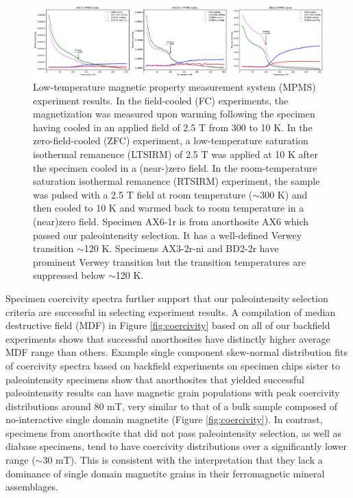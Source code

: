 \documentclass[draft]{agujournal2019}
\begin{document}
\begin{figure}[h!]
\noindent\includegraphics[width=\textwidth]{MPMS.pdf}
\centering
\caption{\footnotesize{Low-temperature magnetic property measurement system (MPMS) experiment results. In the field-cooled (FC) experiments, the magnetization was measured upon warming following the specimen having cooled in an applied field of 2.5 T from 300 to 10 K. In the zero-field-cooled (ZFC) experiment, a low-temperature saturation isothermal remanence (LTSIRM) of 2.5 T was applied at 10 K after the specimen cooled in a (near-)zero field. In the room-temperature saturation isothermal remanence (RTSIRM) experiment, the sample was pulsed with a 2.5 T field at room temperature ($\sim$300 K) and then cooled to 10 K and warmed back to room temperature in a (near)zero field. Specimen AX6-1r is from anorthosite AX6 which passed our paleointensity selection. It has a well-defined Verwey transition $\sim$120 K. Specimens AX3-2r-ni and BD2-2r have prominent Verwey transition but the transition temperatures are suppressed below $\sim$120 K. }}
\label{fig:MPMS}
\end{figure}

Specimen coercivity spectra further support that our paleointensity selection criteria are successful in selecting experiment results. A compilation of median destructive field (MDF) in Figure \ref{fig:coercivity} based on all of our backfield experiments shows that successful anorthosites have distinctly higher average MDF range than others. Example single component skew-normal distribution fits of coercivity spectra based on backfield experiments on specimen chips sister to paleointensity specimens show that anorthosites that yielded successful paleointensity results can have magnetic grain populations with peak coercivity distributions around 80 mT, very similar to that of a bulk sample composed of no-interactive single domain magnetite (Figure \ref{fig:coercivity}). In contrast, specimens from anorthosite that did not pass paleointensity selection, as well as diabase specimens, tend to have coercivity distributions over a significantly lower range ($\sim$30 mT). This is consistent with the interpretation that they lack a dominance of single domain magnetite grains in their ferromagnetic mineral assemblages.
\end{document}
